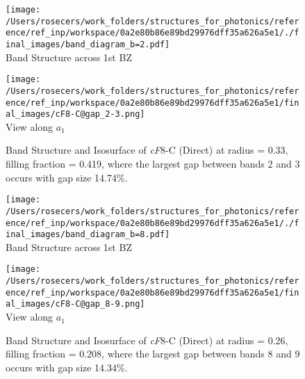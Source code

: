 \begin{figure}[H]
\begin{minipage}{0.5\textwidth}\centering
\texttt{[image: /Users/rosecers/work\_folders/structures\_for\_photonics/reference/ref\_inp/workspace/0a2e80b86e89bd29976dff35a626a5e1/./final\_images/band\_diagram\_b=2.pdf]}
\\Band Structure across 1st BZ
\end{minipage}\hfill
\begin{minipage}{0.48\textwidth}\centering
\texttt{[image: /Users/rosecers/work\_folders/structures\_for\_photonics/reference/ref\_inp/workspace/0a2e80b86e89bd29976dff35a626a5e1/final\_images/cF8-C@gap\_2-3.png]}
\\View along $a_1$ 
\end{minipage}\hfill\caption{Band Structure and Isosurface of \textit{cF}8-C (Direct) at radius = 0.33, filling fraction = 0.419, where the largest gap between bands 2 and 3 occurs with gap size 14.74\%.}

\end{figure}
\vspace{-0.25in}


\begin{figure}[H]
\begin{minipage}{0.5\textwidth}\centering
\texttt{[image: /Users/rosecers/work\_folders/structures\_for\_photonics/reference/ref\_inp/workspace/0a2e80b86e89bd29976dff35a626a5e1/./final\_images/band\_diagram\_b=8.pdf]}
\\Band Structure across 1st BZ
\end{minipage}\hfill
\begin{minipage}{0.48\textwidth}\centering
\texttt{[image: /Users/rosecers/work\_folders/structures\_for\_photonics/reference/ref\_inp/workspace/0a2e80b86e89bd29976dff35a626a5e1/final\_images/cF8-C@gap\_8-9.png]}
\\View along $a_1$ 
\end{minipage}\hfill\caption{Band Structure and Isosurface of \textit{cF}8-C (Direct) at radius = 0.26, filling fraction = 0.208, where the largest gap between bands 8 and 9 occurs with gap size 14.34\%.}

\end{figure}
\vspace{-0.25in}


